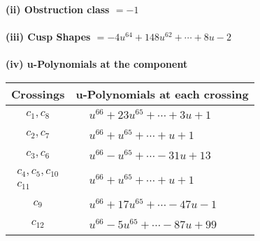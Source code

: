 \documentclass[1p]{elsarticle_modified}
\theoremstyle{definition}
\begin{document}
\flushleft \textbf{(ii) Obstruction class $= -1$}\\~\\
\flushleft \textbf{(iii) Cusp Shapes $= -4 u^{64}+148 u^{62}+\cdots+8 u-2$}\\~\\
\newpage\renewcommand{\arraystretch}{1}
\flushleft \textbf{(iv) u-Polynomials at the component}\newline \\
\begin{tabular}{m{50pt}|m{274pt}}
Crossings & \hspace{64pt}u-Polynomials at each crossing \\
\hline $$\begin{aligned}c_{1},c_{8}\end{aligned}$$&$\begin{aligned}
&u^{66}+23 u^{65}+\cdots+3 u+1
\end{aligned}$\\
\hline $$\begin{aligned}c_{2},c_{7}\end{aligned}$$&$\begin{aligned}
&u^{66}+u^{65}+\cdots+u+1
\end{aligned}$\\
\hline $$\begin{aligned}c_{3},c_{6}\end{aligned}$$&$\begin{aligned}
&u^{66}- u^{65}+\cdots-31 u+13
\end{aligned}$\\
\hline $$\begin{aligned}c_{4},c_{5},c_{10}\\c_{11}\end{aligned}$$&$\begin{aligned}
&u^{66}+u^{65}+\cdots+u+1
\end{aligned}$\\
\hline $$\begin{aligned}c_{9}\end{aligned}$$&$\begin{aligned}
&u^{66}+17 u^{65}+\cdots-47 u-1
\end{aligned}$\\
\hline $$\begin{aligned}c_{12}\end{aligned}$$&$\begin{aligned}
&u^{66}-5 u^{65}+\cdots-87 u+99
\end{aligned}$\\
\hline
\end{tabular}\\~\\
\end{document}
